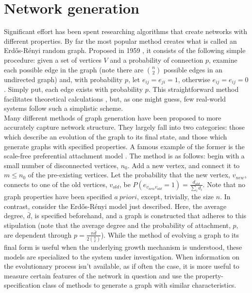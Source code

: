 \documentclass[11pt]{article}
\begin{document}
\section{Network generation}
Significant effort has been spent researching algorithms that create networks with different properties. By far the most popular method creates what is called an Erd\H{o}s-R\'{e}nyi random graph. Proposed in 1959 \cite{Erdos1959}, it consists of the following simple procedure: given a set of vertices $V$ and a probability of connection $p$, examine each possible edge in the graph (note there are ${n \choose 2}$ possible edges in an undirected graph) and, with probability $p$, let $e_{ij}=e_{ji}=1$, otherwise $e_{ij}=e_{ij}=0$. Simply put, each edge exists with probability $p$. This straightforward method facilitates theoretical calculations \cite{a couple math papers}, but, as one might guess, few real-world systems follow such a simplistic scheme. \vspace{1mm}\\
Many different methods of graph generation have been proposed to more accurately capture network structure. They largely fall into two categories: those which describe an evolution of the graph to its final state, and those which generate graphs with specified properties. A famous example of the former is the scale-free preferential attachment model \cite{Barabasi1999}. The method is as follows: begin with a small number of disconnected vertices, $n_{0}$. Add a new vertex, and connect it to $m\le n_{0}$ of the pre-existing vertices. Let the probability that the new vertex, $v_{new}$, connects to one of the old vertices, $v_{old}$, be $P(e_{v_{new}v_{old}}=1)=\frac{d_{old}}{\sum\limits_{i} d_{i}}$. Note that no graph properties have been specified $a\ priori$, except, trivially, the size $n$. In contrast, consider the Erd\H{o}s-R\'{e}nyi model just described. Here, the average degree, $\bar{d}$, is specified beforehand, and a graph is constructed that adheres to this stipulation (note that the average degree and the probability of attachment, $p$, are dependent through $p=\frac{n\bar{d}}{2 {n \choose 2}}$). While the method of evolving a graph to its final form is useful when the underlying growth mechanism is understood, these models are specialized to the system under investigation. When information on the evolutionary process isn't available, as if often the case, it is more useful to measure certain features of the network in question and use the property-specification class of methods to generate a graph with similar characteristics.\vspace{1mm}\\
\end{document}
